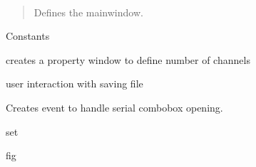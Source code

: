 \documentclass[letterpaper,10pt,english]{sphinxmanual}
\begin{document}

\begin{fulllineitems}
\label{\detokenize{code:mainGUI.Main}}~\begin{quote}

Defines the mainwindow.
\end{quote}

Constants

\begin{fulllineitems}
\label{\detokenize{code:mainGUI.Main.channelsCaller}}
creates a property window to define number of channels

\end{fulllineitems}


\begin{fulllineitems}
\label{\detokenize{code:mainGUI.Main.choose_file}}
user interaction with saving file

\end{fulllineitems}


\begin{fulllineitems}
\label{\detokenize{code:mainGUI.Main.eventFilter}}
Creates event to handle serial combobox opening.

\end{fulllineitems}


\begin{fulllineitems}
\label{\detokenize{code:mainGUI.Main.file_changed}}
set

\end{fulllineitems}


\begin{fulllineitems}
\label{\detokenize{code:mainGUI.Main.format}}
fig


\end{fulllineitems}
\end{fulllineitems}
\end{document}
